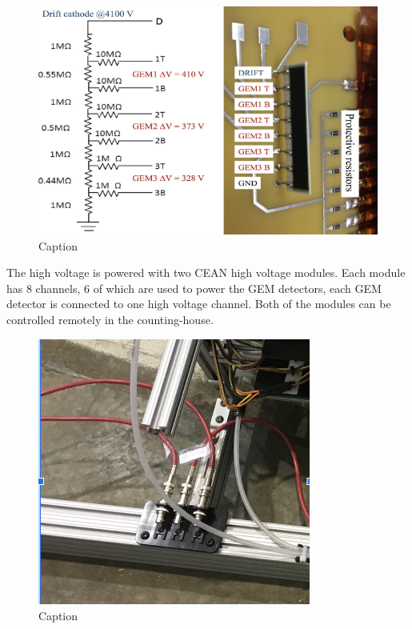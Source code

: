 \begin{figure}
    \centering
    \includegraphics[width=\textwidth]{images/chap3/GEM_register_chain.png}
    \caption{Caption}
    \label{fig:enter-label}
\end{figure}


The high voltage is powered with two CEAN high voltage modules. Each module has 8 channels, 6 of which are used to power the GEM detectors, each GEM detector is connected to one high voltage channel.  Both of the modules can be controlled remotely in the counting-house. 

\begin{figure}[!htbp]
    \centering
    \includegraphics[width=0.8\textwidth]{images/chap3/gem_hv_connector.png}
    \caption{Caption}
    \label{fig:enter-label}
\end{figure}

